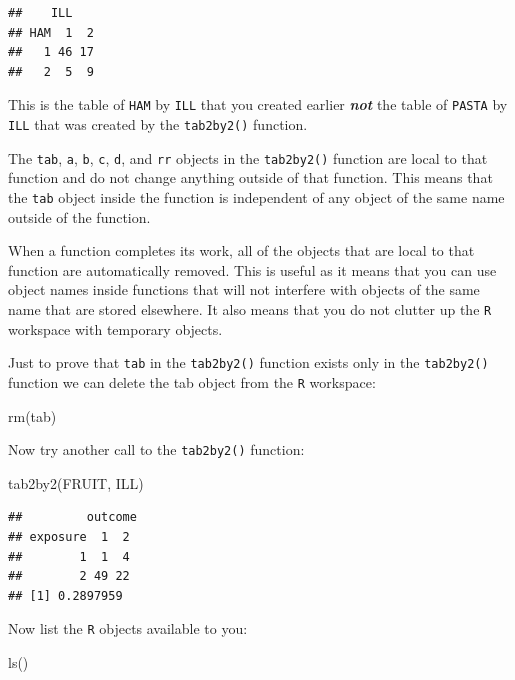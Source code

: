 \documentclass[
  12pt,
]{book}
\newenvironment{Shaded}{\begin{snugshade}}{\end{snugshade}}
\newcommand{\FunctionTok}[1]{\textcolor[rgb]{0.00,0.00,0.00}{#1}}
\newcommand{\NormalTok}[1]{#1}
\begin{document}
\begin{verbatim}
##    ILL
## HAM  1  2
##   1 46 17
##   2  5  9
\end{verbatim}

This is the table of \texttt{HAM} by \texttt{ILL} that you created earlier \textbf{\emph{not}} the table of \texttt{PASTA} by \texttt{ILL} that was created by the \texttt{tab2by2()} function.

The \texttt{tab}, \texttt{a}, \texttt{b}, \texttt{c}, \texttt{d}, and \texttt{rr} objects in the \texttt{tab2by2()} function are local to that function and do not change anything outside of that function. This means that the \texttt{tab} object inside the function is independent of any object of the same name outside of the function.

When a function completes its work, all of the objects that are local to that function are automatically removed. This is useful as it means that you can use object names inside functions that will not interfere with objects of the same name that are stored elsewhere. It also means that you do not clutter up the \texttt{R} workspace with temporary objects.

Just to prove that \texttt{tab} in the \texttt{tab2by2()} function exists only in the \texttt{tab2by2()} function we can delete the tab object from the \texttt{R} workspace:

\begin{Shaded}
\begin{Highlighting}[]
\FunctionTok{rm}\NormalTok{(tab)}
\end{Highlighting}
\end{Shaded}

Now try another call to the \texttt{tab2by2()} function:

\begin{Shaded}
\begin{Highlighting}[]
\FunctionTok{tab2by2}\NormalTok{(FRUIT, ILL)}
\end{Highlighting}
\end{Shaded}

\begin{verbatim}
##         outcome
## exposure  1  2
##        1  1  4
##        2 49 22
## [1] 0.2897959
\end{verbatim}

\newpage

Now list the \texttt{R} objects available to you:

\begin{Shaded}
\begin{Highlighting}[]
\FunctionTok{ls}\NormalTok{()}
\end{Highlighting}
\end{Shaded}
\end{document}
